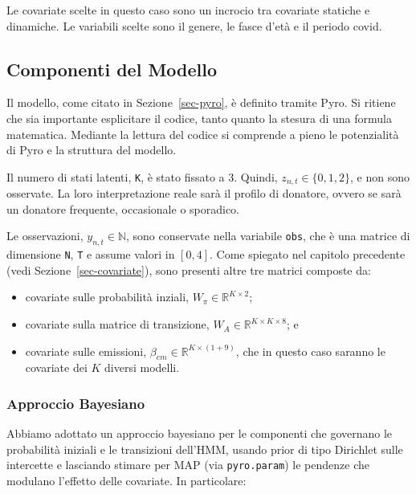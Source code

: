 \documentclass[
  italian,
  a4paper,
  a4paper,
  twoside,
  open=right,
  12pt]{scrbook}
\theoremstyle{definition}
\theoremstyle{remark}
\begin{document}
Le covariate scelte in questo caso sono un incrocio tra covariate
statiche e dinamiche. Le variabili scelte sono il genere, le fasce d'età
e il periodo covid.

\subsection{Componenti del Modello}\label{componenti-del-modello}

Il modello, come citato in Sezione~\ref{sec-pyro}, è definito tramite
Pyro. Si ritiene che sia importante esplicitare il codice, tanto quanto
la stesura di una formula matematica. Mediante la lettura del codice si
comprende a pieno le potenzialità di Pyro e la struttura del modello.

Il numero di stati latenti, \texttt{K}, è stato fissato a 3. Quindi,
\(z_{n,t} \in \{0,1,2\}\), e non sono osservate. La loro interpretazione
reale sarà il profilo di donatore, ovvero se sarà un donatore frequente,
occasionale o sporadico.

Le osservazioni, \(y_{n,t} \in \mathbb{N}\), sono conservate nella
variabile \texttt{obs}, che è una matrice di dimensione \texttt{N},
\texttt{T} e assume valori in \([0,4]\). Come spiegato nel capitolo
precedente (vedi Sezione~\ref{sec-covariate}), sono presenti altre tre
matrici composte da:

\begin{itemize}
\item
  covariate sulle probabilità inziali,
  \(W_\pi \in \mathbb{R}^{K\times 2}\);
\item
  covariate sulla matrice di transizione,
  \(W_A \in \mathbb{R}^{K\times K \times 8}\); e
\item
  covariate sulle emissioni,
  \(\beta_{em} \in \mathbb{R}^{K \times (1+9)}\), che in questo caso
  saranno le covariate dei \(K\) diversi modelli.
\end{itemize}

\subsubsection{Approccio Bayesiano}\label{sec-bayesiano}

Abbiamo adottato un approccio bayesiano per le componenti che governano
le probabilità iniziali e le transizioni dell'HMM, usando prior di tipo
Dirichlet sulle intercette e lasciando stimare per MAP (via
\texttt{pyro.param}) le pendenze che modulano l'effetto delle covariate.
In particolare:
\end{document}
